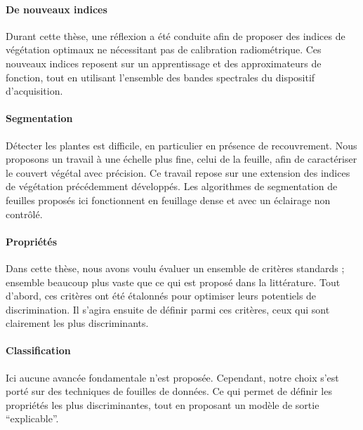 \documentclass[../thesis.tex]{subfiles}
\begin{document}
    \paragraph{De nouveaux indices} Durant cette thèse, une réflexion a été conduite afin de proposer des indices de végétation optimaux ne nécessitant pas de calibration radiométrique. Ces nouveaux indices reposent sur un apprentissage et des approximateurs de fonction, tout en utilisant l'ensemble des bandes spectrales du dispositif d'acquisition. %
    
    \paragraph{Segmentation} Détecter les plantes est difficile, en particulier en présence de recouvrement. Nous proposons un travail à une échelle plus fine, celui de la feuille, afin de caractériser le couvert végétal avec précision. Ce travail repose sur une extension des indices de végétation précédemment développés. Les algorithmes de segmentation de feuilles proposés ici fonctionnent en feuillage dense et avec un éclairage non contrôlé. 
    
    \paragraph{Propriétés} %
    Dans cette thèse, nous avons voulu évaluer un ensemble de critères standards ; ensemble beaucoup plus vaste que ce qui est proposé dans la littérature. Tout d'abord, ces critères ont été étalonnés pour optimiser leurs potentiels de discrimination. Il s'agira ensuite de définir parmi ces critères, ceux qui sont clairement les plus discriminants.
    
    \paragraph{Classification} Ici aucune avancée fondamentale n'est proposée. Cependant, notre choix s'est porté sur des techniques de fouilles de données. Ce qui permet de définir les propriétés les plus discriminantes, tout en proposant un modèle de sortie ``explicable''.
    
    
\end{document}
